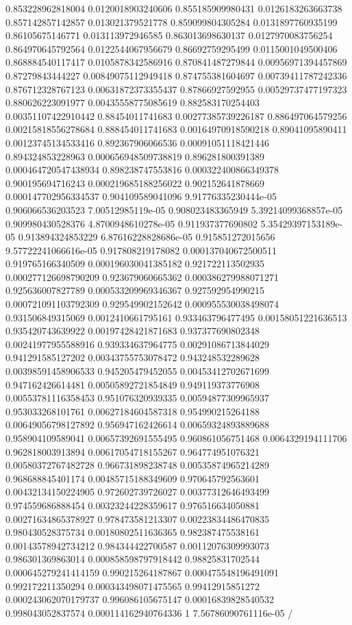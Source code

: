 \begin{table}
\begin{tabu}
\begin{sparkline}{10}
0.853228962818004 0.0120018903240606 0.855185909980431 0.0126183263663738 0.857142857142857 0.013021379521778 0.859099804305284 0.0131897760935199 0.86105675146771 0.013113972946585 0.863013698630137 0.0127970083756254 0.864970645792564 0.0122544067956679 0.86692759295499 0.0115001049500406 0.868884540117417 0.0105878342586916 0.870841487279844 0.00956971394457869 0.87279843444227 0.00849075112949418 0.874755381604697 0.00739411787242336 0.876712328767123 0.00631872373355437 0.87866927592955 0.00529737477197323 0.880626223091977 0.00435558775085619 0.882583170254403 0.00351107422910442 0.88454011741683 0.00277385739226187 0.886497064579256 0.00215818556278684 0.888454011741683 0.00164970918590218 0.89041095890411 0.00123745134533416 0.892367906066536 0.00091051118421446 0.894324853228963 0.000656948509738819 0.896281800391389 0.000464720547438934 0.898238747553816 0.000322400866349378 0.900195694716243 0.000219685188256022 0.902152641878669 0.000147702956334537 0.904109589041096 9.91776335230444e-05 0.906066536203523 7.00512985119e-05 0.908023483365949 5.39214099368857e-05 0.909980430528376 4.8700948610278e-05 0.911937377690802 5.35429397153189e-05 0.913894324853229 6.87616228828686e-05 0.915851272015656 9.57722241066616e-05 0.917808219178082 0.000137040672500511 0.919765166340509 0.000196030041385182 0.921722113502935 0.000277126698790209 0.923679060665362 0.000386279988071271 0.925636007827789 0.000533209969346367 0.927592954990215 0.000721091103792309 0.929549902152642 0.000955530038498074 0.931506849315069 0.0012410661795161 0.933463796477495 0.00158051221636513 0.935420743639922 0.00197428421871683 0.937377690802348 0.00241977955588916 0.939334637964775 0.00291086713844029 0.941291585127202 0.00343755753078472 0.943248532289628 0.00398591458906533 0.945205479452055 0.00453412702671699 0.947162426614481 0.00505892721854849 0.949119373776908 0.00553781116358453 0.951076320939335 0.00594877309965937 0.953033268101761 0.00627184604587318 0.954990215264188 0.00649056798127892 0.956947162426614 0.00659324893889688 0.958904109589041 0.00657392691555495 0.960861056751468 0.0064329194111706 0.962818003913894 0.00617054718155267 0.964774951076321 0.00580372767482728 0.966731898238748 0.00535874965214289 0.968688845401174 0.00485715188349609 0.970645792563601 0.00432134150224905 0.972602739726027 0.00377312646493499 0.974559686888454 0.00323244228359617 0.976516634050881 0.00271634865378927 0.978473581213307 0.00223834486470835 0.980430528375734 0.00180802511636365 0.982387475538161 0.00143578942734212 0.984344422700587 0.00112076309993073 0.986301369863014 0.000858598797918442 0.98825831702544 0.000645279241414159 0.990215264187867 0.000475548196491091 0.992172211350294 0.000343498071475565 0.99412915851272 0.000243062070179737 0.996086105675147 0.00016839828540532 0.998043052837574 0.000114162940764336 1 7.56786090761116e-05 /

\end{sparkline}
\end{tabu}
\end{table}

